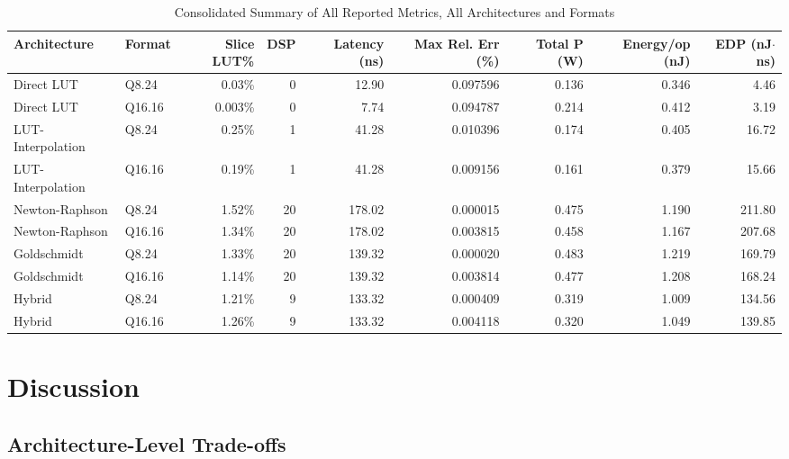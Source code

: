 \documentclass[manuscript,screen,review]{acmart}
\begin{document}
\begin{table}[H]
\small
\setlength{\tabcolsep}{3pt}
\caption{Consolidated Summary of All Reported Metrics, All Architectures and Formats}
\label{tab:consolidated}
\begin{tabular}{@{}llrrrrrrr@{}}
\toprule
\textbf{Architecture} & \textbf{Format} & \textbf{Slice LUT\%} & \textbf{DSP} & \textbf{Latency (ns)} & \textbf{Max Rel. Err (\%)} & \textbf{Total P (W)} & \textbf{Energy/op (nJ)} & \textbf{EDP (nJ$\cdot$ns)} \\
\midrule
Direct LUT & Q8.24 & 0.03\% & 0 & 12.90 & 0.097596 & 0.136 & 0.346 & 4.46 \\
Direct LUT & Q16.16 & 0.003\% & 0 & 7.74 & 0.094787 & 0.214 & 0.412 & 3.19 \\
LUT-Interpolation & Q8.24 & 0.25\% & 1 & 41.28 & 0.010396 & 0.174 & 0.405 & 16.72 \\
LUT-Interpolation & Q16.16 & 0.19\% & 1 & 41.28 & 0.009156 & 0.161 & 0.379 & 15.66 \\
Newton-Raphson & Q8.24 & 1.52\% & 20 & 178.02 & 0.000015 & 0.475 & 1.190 & 211.80 \\
Newton-Raphson & Q16.16 & 1.34\% & 20 & 178.02 & 0.003815 & 0.458 & 1.167 & 207.68 \\
Goldschmidt & Q8.24 & 1.33\% & 20 & 139.32 & 0.000020 & 0.483 & 1.219 & 169.79 \\
Goldschmidt & Q16.16 & 1.14\% & 20 & 139.32 & 0.003814 & 0.477 & 1.208 & 168.24 \\
Hybrid & Q8.24 & 1.21\% & 9 & 133.32 & 0.000409 & 0.319 & 1.009 & 134.56 \\
Hybrid & Q16.16 & 1.26\% & 9 & 133.32 & 0.004118 & 0.320 & 1.049 & 139.85 \\
\bottomrule
\end{tabular}
\end{table}

\section{Discussion}
\label{sec:discussion}

\subsection{Architecture-Level Trade-offs}
\end{document}
